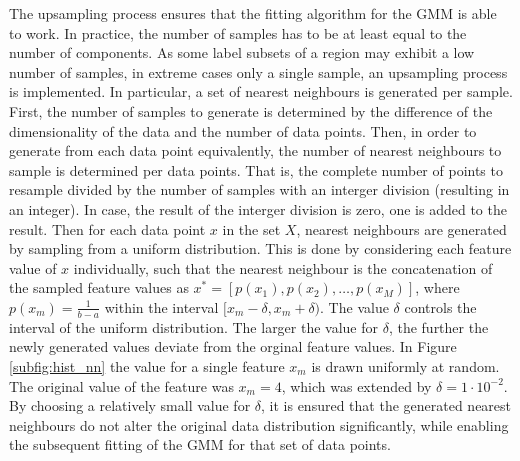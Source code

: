  The upsampling process ensures that the fitting algorithm for the GMM is able to work. In practice, the number of samples has to be at least equal to the number of components. As some label subsets of a region may exhibit a low number of samples, in extreme cases only a single sample, an upsampling process is implemented. In particular, a set of nearest neighbours is generated per sample. First, the number of samples to generate is determined by the difference of the dimensionality of the data and the number of data points. Then, in order to generate from each data point equivalently, the number of nearest neighbours to sample is determined per data points. That is, the complete number of points to resample divided by the number of samples with an interger division (resulting in an integer). In case, the result of the interger division is zero, one is added to the result. Then for each data point $x$ in the set $X$, nearest neighbours are generated by sampling from a uniform distribution. This is done by considering each feature value of $x$ individually, such that the nearest neighbour is the concatenation of the sampled feature values as $x^* = [p(x_1), p(x_2), \dots, p(x_M)]$, where $p(x_m)=\frac{1}{b-a}$ within the interval $[x_m-\delta, x_m+\delta)$. The value $\delta$ controls the interval of the uniform distribution. The larger the value for $\delta$, the further the newly generated values deviate from the orginal feature values. In Figure \ref{subfig:hist_nn} the value for a single feature $x_m$ is drawn uniformly at random. The original value of the feature was $x_m=4$, which was extended by $\delta=1\cdot10^{-2}$. By choosing a relatively small value for $\delta$, it is ensured that the generated nearest neighbours do not alter the original data distribution significantly, while enabling the subsequent fitting of the GMM for that set of data points.


